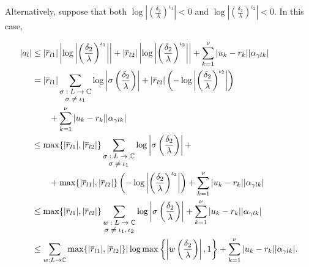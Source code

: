 Alternatively, suppose that both $\log\left|\left(\frac{\delta_2}{\lambda}\right)^{\iota_1}\right| < 0$ and $\log\left|\left(\frac{\delta_2}{\lambda}\right)^{\iota_2}\right| < 0$. In this case,

\begin{align*}
|a_l| 	& \leq |\overline{r}_{l1}|\left|\log\left|\left(\frac{\delta_2}{\lambda}\right)^{\iota_1}\right|\right| + |\overline{r}_{l2}|\left|\log\left|\left(\frac{\delta_2}{\lambda}\right)^{\iota_2}\right|\right| + \sum_{k=1}^{\nu}|u_k-r_k||\alpha_{\gamma l k}|\\
	& = |\overline{r}_{l1}|\sum_{\shortstack{\footnotesize $\sigma: L \to \mathbb{C} $\\ \footnotesize $ \sigma \neq \iota_1$}} \log\left|\sigma \left(\frac{\delta_2}{\lambda}\right)\right|+ |\overline{r}_{l2}|\left(-\log\left|\left(\frac{\delta_2}{\lambda}\right)^{\iota_2}\right|\right) \\
	& \quad \quad + \sum_{k=1}^{\nu}|u_k-r_k||\alpha_{\gamma l k}| \\
	& \leq \max\{|\overline{r}_{l1}|, |\overline{r}_{l2}|\}\sum_{\shortstack{\footnotesize $\sigma: L \to \mathbb{C} $\\ \footnotesize $ \sigma \neq \iota_1$}} \log\left|\sigma \left(\frac{\delta_2}{\lambda}\right)\right| +\\
	& \quad \quad +\max\{|\overline{r}_{l1}|, |\overline{r}_{l2}|\}\left(-\log\left|\left(\frac{\delta_2}{\lambda}\right)^{\iota_2}\right|\right) + \sum_{k=1}^{\nu}|u_k-r_k||\alpha_{\gamma l k}|\\
	& \leq \max\{|\overline{r}_{l1}|, |\overline{r}_{l2}|\}\sum_{\shortstack{\footnotesize $w: L \to \mathbb{C} $\\ \footnotesize $ \sigma \neq \iota_1, \iota_2$}} \log\left|\sigma \left(\frac{\delta_2}{\lambda}\right)\right|  + \sum_{k=1}^{\nu}|u_k-r_k||\alpha_{\gamma l k}|\\
	&  \leq \sum_{w: L \to \mathbb{C}}\max\{|\overline{r}_{l1}|, |\overline{r}_{l2}|\}|\log\max\left\{\left|w\left(\frac{\delta_2}{\lambda}\right)\right|,1\right\} + \sum_{k=1}^{\nu}|u_k-r_k||\alpha_{\gamma l k}|.
\end{align*}

